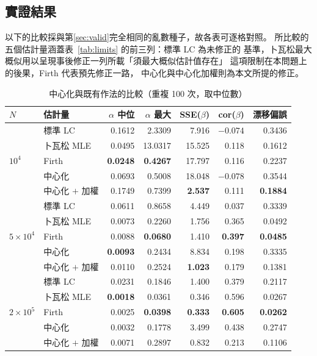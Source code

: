 \documentclass[UTF8, fontset=macnew, a4paper, 12pt]{ctexart}
\begin{document}
\subsection{實證結果}

以下的比較採與第\ref{sec:valid}完全相同的亂數種子，故各表可逐格對照。
所比較的五個估計量涵蓋表~\ref{tab:limits} 的前三列：標準 LC 為未修正的
基準，卜瓦松最大概似用以呈現事後修正一列所載「須最大概似估計值存在」
這項限制在本問題上的後果，Firth 代表預先修正一路，
中心化與中心化加權則為本文所提的修正。

\begin{table}[H]
\centering
\caption{中心化與既有作法的比較（重複 100 次，取中位數）}
\small
\begin{tabular}{llrrrrr}
\toprule
$N$ & 估計量 & $\alpha$ 中位 & $\alpha$ 最大 & SSE($\beta$) & cor($\beta$) & 漂移偏誤\\
\midrule
\multirow{5}{*}{$10^4$}
 & 標準 LC          & 0.1612 & 2.3309 & 7.916 & $-0.074$ & 0.3436\\
 & 卜瓦松 MLE       & 0.0495 & 13.0317 & 15.525 & 0.118 & 0.1612\\
 & Firth            & \textbf{0.0248} & \textbf{0.4267} & 17.797 & 0.116 & 0.2237\\
 & 中心化           & 0.0693 & 0.5008 & 18.048 & $-0.078$ & 0.3544\\
 & 中心化 $+$ 加權   & 0.1749 & 0.7399 & \textbf{2.537} & 0.111 & \textbf{0.1884}\\
\midrule
\multirow{5}{*}{$5\times10^4$}
 & 標準 LC          & 0.0611 & 0.8658 & 4.449 & 0.037 & 0.3339\\
 & 卜瓦松 MLE       & 0.0073 & 0.2260 & 1.756 & 0.365 & 0.0492\\
 & Firth            & 0.0088 & \textbf{0.0680} & 1.410 & \textbf{0.397} & \textbf{0.0485}\\
 & 中心化           & \textbf{0.0093} & 0.2434 & 8.834 & 0.198 & 0.3335\\
 & 中心化 $+$ 加權   & 0.0110 & 0.2524 & \textbf{1.023} & 0.179 & 0.1381\\
\midrule
\multirow{5}{*}{$2\times10^5$}
 & 標準 LC          & 0.0231 & 0.1846 & 1.400 & 0.379 & 0.2117\\
 & 卜瓦松 MLE       & \textbf{0.0018} & 0.0361 & 0.346 & 0.596 & 0.0267\\
 & Firth            & 0.0025 & \textbf{0.0398} & \textbf{0.333} & \textbf{0.605} & \textbf{0.0262}\\
 & 中心化           & 0.0032 & 0.1778 & 3.499 & 0.438 & 0.2747\\
 & 中心化 $+$ 加權   & 0.0071 & 0.2897 & 0.832 & 0.213 & 0.1106\\
\bottomrule
\end{tabular}
\label{tab:estcmp}
\end{table}
\end{document}
